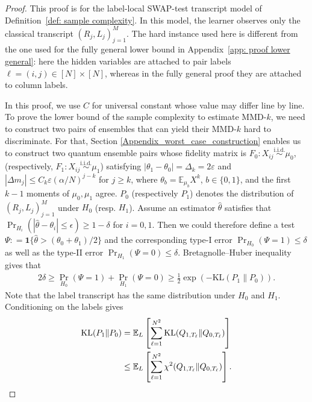 \documentclass[aps,prx,reprint,superscriptaddress,amsmath,amssymb,longbibliography,floatfix]{revtex4-2}
\newcommand{\dsE}{\mathbb{E}}
\theoremstyle{plain}
\theoremstyle{definition}
\theoremstyle{remark}
\begin{document}
\begin{proof}
This proof is for the label-local SWAP-test transcript model of
Definition~\ref{def: sample complexity}. In this model, the learner observes
only the classical transcript $(R_j,L_j)_{j=1}^M$. The hard instance used here
is different from the one used for the fully general lower bound in
Appendix~\ref{app: proof lower general}: here the hidden variables are attached
to pair labels $\ell=(i,j)\in[N]\times[N]$, whereas in the fully general proof
they are attached to column labels.

In this proof, we use $C$ for universal constant whose value may differ line by line. To prove the lower bound of the sample complexity to estimate MMD-$k$, we need to construct two pairs of ensembles that can yield their MMD-$k$ hard to discriminate. For that, 
Section \ref{Appendix_worst_case_construction} enables us to construct two quantum ensemble pairs whose fidelity matrix is $F_0  : X_{ij} \overset{\text{i.i.d.}}{\sim} \mu_0$, (respectively, $F_1  : X_{ij} \overset{\text{i.i.d.}}{\sim} \mu_1$) satisfying $|\theta_1 - \theta_0| = \Delta_k = 2\varepsilon$ and $|\Delta m_j| \leq C_k\varepsilon(\alpha/N)^{j-k}$ for $j\ge k$, where $\theta_b = \dsE_{\mu_b} X^k$, $b\in\{0,1\}$, and the first $k-1$ moments of $\mu_0,\mu_1$ agree. $P_0$ (respectively $P_1$) denotes the distribution of $(R_j, L_j)_{j=1}^M$ under $H_0$ (resp. $H_1$). Assume an estimator $\hat{\theta}$ satisfies that $\Pr_{H_i} ( |\hat{\theta} - \theta_i| \leq \epsilon ) \geq 1 - \delta$ for $i=0,1$. Then we could therefore define a test $\Psi : = \mathbf 1 \{ \hat{\theta} > (\theta_0 + \theta_1)/2 \}$ and the corresponding type-I error $\Pr_{H_0} (\Psi = 1)\leq \delta$ as well as the type-II error $\Pr_{H_1} (\Psi = 0)\leq \delta$. Bretagnolle--Huber inequality \cite{canonne2022short} gives that
\begin{align}\label{Bretagnolle_Huber_inequality}
    2\delta\geq \Pr_{H_0} (\Psi = 1)+ \Pr_{H_1} (\Psi = 0) \geq \frac{1}{2} \exp( - \text{KL} (P_1\|P_0)).
\end{align}
Note that the label transcript has the same distribution under \(H_0\) and \(H_1\). Conditioning on the labels gives
\begin{align}
     \text{KL} (P_1\|P_0)
     &= \dsE_L\left[
     \sum_{\ell=1}^{N^2}
     \text{KL} ( Q_{1,T_\ell} \| Q_{0,T_\ell} )
     \right] \notag\\
     &\leq
     \dsE_L\left[
     \sum_{\ell=1}^{N^2}
     \chi^2 ( Q_{1,T_\ell} \| Q_{0,T_\ell} )
     \right].
\label{eq:app-local-mmd-transcript-divergence}
\end{align}


\end{proof}
\end{document}
